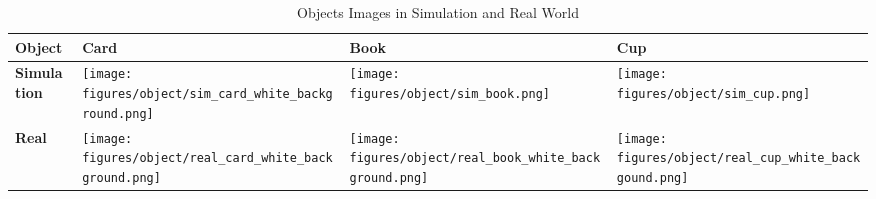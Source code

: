 
\begin{table}[ht]
\centering
\small
\caption{Objects Images in Simulation and Real World}
\begin{adjustbox}{max width=0.9\textwidth}
\begin{tabular}{|>{\centering\arraybackslash}m{}|>{\centering\arraybackslash}m{}|>{\centering\arraybackslash}m{}|>{\centering\arraybackslash}m{}|}
\hline
\textbf{Object} & \textbf{Card} & \textbf{Book} & \textbf{Cup} \\
\hline
\textbf{Simulation} & \texttt{[image: figures/object/sim\_card\_white\_background.png]} & \texttt{[image: figures/object/sim\_book.png]} & \texttt{[image: figures/object/sim\_cup.png]} \\
\hline
\textbf{Real} & \texttt{[image: figures/object/real\_card\_white\_background.png]} & \texttt{[image: figures/object/real\_book\_white\_background.png]} & \texttt{[image: figures/object/real\_cup\_white\_backgound.png]} \\
\hline
\end{tabular}
\end{adjustbox}
\label{tab:objects_sim_real}
\end{table}